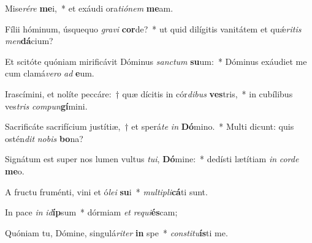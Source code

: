 \item Mise\textit{ré}\textit{re} \textbf{me}i,~* et exáudi ora\textit{ti}\textit{ó}\textit{nem} \textbf{me}am.
\item Fílii hóminum, úsquequo \textit{gra}\textit{vi} \textbf{cor}de?~* ut quid dilígitis vanitátem et quǽ\textit{ri}\textit{tis} \textit{men}\textbf{dá}cium?
\item Et scitóte quóniam mirificávit Dóminus \textit{sanc}\textit{tum} \textbf{su}um:~* Dóminus exáudiet me cum clamá\textit{ve}\textit{ro} \textit{ad} \textbf{e}um.
\item Irascímini, et nolíte peccáre:~† quæ dícitis in cór\textit{di}\textit{bus} \textbf{ves}tris,~* in cubílibus ves\textit{tris} \textit{com}\textit{pun}\textbf{gí}mini.
\item Sacrificáte sacrifícium justítiæ,~† et sperá\textit{te} \textit{in} \textbf{Dó}mino.~* Multi dicunt: quis ostén\textit{dit} \textit{no}\textit{bis} \textbf{bo}na?
\item Signátum est super nos lumen vultus \textit{tu}\textit{i}, \textbf{Dó}mine:~* dedísti lætítiam \textit{in} \textit{cor}\textit{de} \textbf{me}o.
\item A fructu fruménti, vini et ó\textit{le}\textit{i} \textbf{su}i~* \textit{mul}\textit{ti}\textit{pli}\textbf{cá}ti sunt.
\item In pace \textit{in} \textit{id}\textbf{íp}sum~* dórmiam \textit{et} \textit{re}\textit{qui}\textbf{és}cam;
\item Quóniam tu, Dómine, singulá\textit{ri}\textit{ter} \textbf{in} spe~* \textit{con}\textit{sti}\textit{tu}\textbf{ís}ti me.
